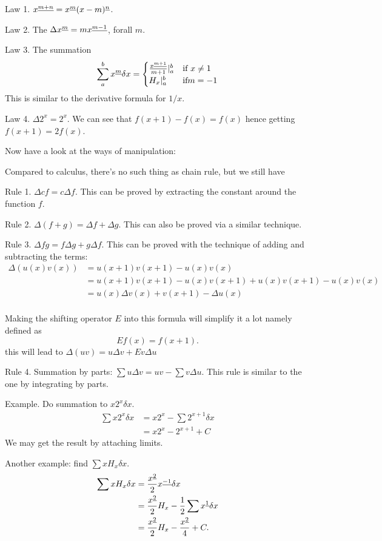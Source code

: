 Law 1. $x^{\underline{m+n}}=x^{\underline{m}}(x-m)^{\underline{n}}$. 

Law 2. The $\Delta x^{\underline{m}}=mx^{\underline{m-1}}$, forall $m$. 

Law 3. The summation 
\[
    \sum_{a}^{b} x^{\underline{m}} \delta x = 
    \begin{cases}
        \frac{x^{\underline{m+1}}}{m+1} | _a ^ b & \text{if } x \neq 1 \\
        H_x|_a^b & \text{if} m=-1
    \end{cases}
\]
This is similar to the derivative formula for $1/x$. 

Law 4. $\Delta 2^x=2^x$. We can see that $f(x+1)-f(x)=f(x)$ hence getting 
$f(x+1)=2f(x)$. 

Now have a look at the ways of manipulation: 

Compared to calculus, there's no such thing as chain rule, but we still have

Rule 1. $\Delta cf=c\Delta  f$. This can be proved by extracting the constant
around the function $f$. 

Rule 2. $\Delta (f+g)=\Delta f+\Delta g$. This can also be proved via 
a similar technique. 

Rule 3. $\Delta fg = f\Delta g+g\Delta f$. This can be proved with the 
technique of adding and subtracting the terms: 
\begin{align*}
   \Delta (u(x)v(x)) &= u(x+1)v(x+1)-u(x)v(x) \\
   &= u(x+1)v(x+1)-u(x)v(x+1)+u(x)v(x+1)-u(x)v(x) \\
   &= u(x)\Delta v(x)+v(x+1)-\Delta u(x) \\
\end{align*}

Making the shifting operator $E$ into this formula will simplify it a lot
namely defined as 
\[
    Ef(x)=f(x+1).
\]
this will lead to $\Delta (uv)=u\Delta v +Ev\Delta u$

Rule 4. Summation by parts: $\sum u\Delta v=uv-\sum v\Delta u$. This rule is
similar to the one by integrating by parts. 

Example. Do summation to $x 2^x \delta x$. 
\begin{align*}
    \sum x 2^x \delta x &= x 2^x-\sum 2^{x+1} \delta x \\
                        &= x 2^x - 2^{x+1} +C
\end{align*}
We may get the result by attaching limits.

Another example: find $\sum xH_x\delta x$. 
\begin{align*}
    \sum xH_x \delta x &= {x^{\underline{2}}\over 2} x^{\underline{-1}} \delta x \\
                       &= {x^{\underline{2}} \over 2} H_x - \frac{1}{2} \sum x^{\underline{1}} 
                       \delta x \\
                       &= {x^{\underline{2}} \over 2} H_x - {x^{\underline{2}} \over 4}+C.
\end{align*}

